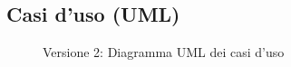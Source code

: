 \subsection{Casi d'uso (UML)}
\vspace{0.5cm}
\begin{figure}[H]
    \centering
    \caption{Versione 2: Diagramma UML dei casi d'uso}
    \label{fig:use_case_uml_v2}
\end{figure}
